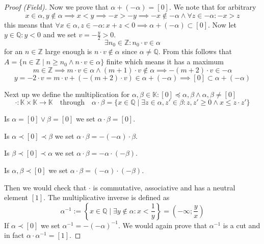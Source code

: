 \begin{proof}[Proof (Field)]
   Now we prove that \(\alpha + (-\alpha) = [0]\).
   We note that for arbitrary
   \[x \in \alpha, y \not\in \alpha \implies x < y \implies -x > -y \implies -x \not\in -\alpha \land \forall z \in -\alpha: -x > z\]
   this means that \(\forall x \in \alpha, z \in -\alpha: x + z < 0 \implies \alpha + (-\alpha) \subset [0]\).
   Now let \(y \in \mathbb{Q}: y < 0\) and we set \(v = -\frac{y}{2} > 0\).
   \[\exists n_0 \in \mathbb{Z}: n_0 \cdot v \in \alpha\]
   for an \(n \in \mathbb{Z}\) large enough is \(n \cdot v \not\in \alpha\) since \(\alpha \neq \mathbb{Q}\).
   From this follows that \(A = \{n \in \mathbb{Z} \mid n \geq n_0 \land n \cdot v \in \alpha\}\) finite which means it has a maximum
   \[m \in \mathbb{Z} \implies m \cdot v \in \alpha \land (m + 1) \cdot v \not\in \alpha \implies -(m + 2) \cdot v \in -\alpha\]
   \[y = -2 \cdot v = m \cdot v + (-(m + 2) \cdot v) \in \alpha + (-\alpha) \implies [0] \subset \alpha + (-\alpha)\]

   Next up we define the multiplication for \(\alpha, \beta \in \mathbb{K}: [0] \preceq \alpha, \beta \land \alpha, \beta \neq [0]\)
   \[\cdot: \mathbb{K} \times \mathbb{K} \to \mathbb{K} \quad\text{through}\quad \alpha \cdot \beta = \{x \in \mathbb{Q} \mid \exists z \in \alpha, z' \in \beta: z, z' \geq 0 \land x \leq z \cdot z'\}\]

   Is \(\alpha = [0] \lor \beta = [0]\) we set \(\alpha \cdot \beta = [0]\).

   Is \(\alpha \prec [0] \prec \beta\) we set \(\alpha \cdot \beta = -(-\alpha) \cdot \beta\).

   Is \(\beta \prec [0] \prec \alpha\) we set \(\alpha \cdot \beta = -\alpha \cdot (-\beta)\).

   Is \(\alpha, \beta \prec [0]\) we set \(\alpha \cdot \beta = (-\alpha) \cdot (-\beta)\).

   Then we would check that \(\cdot\) is commutative, associative and has a neutral element \([1]\).
   The multiplicative inverse is defined as
   \[\alpha^{-1} := \left\{x \in \mathbb{Q} \mid \exists y \not\in \alpha: x < \frac{1}{y}\right\} = \left(-\infty; \frac{y}{x}\right)\]
   If \(\alpha \prec [0]\) we set \(\alpha^{-1} = -(-\alpha)^{-1}\).
   We would again prove that \(\alpha^{-1}\) is a cut and in fact \(\alpha \cdot \alpha^{-1} = [1]\).


\end{proof}
